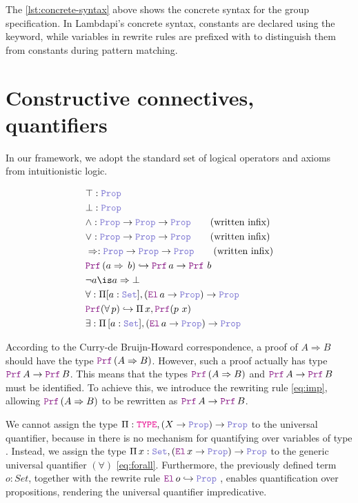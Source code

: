 The \cref{lst:concrete-syntax} above shows the concrete syntax for the group specification. In Lambdapi's concrete syntax, constants are declared using the  keyword,
while variables in rewrite rules are prefixed with \kw{\$} to distinguish them from constants during pattern matching.


\section{Constructive connectives, quantifiers}
\label{ssec:encoding-prop}

In our framework, we adopt the standard set of logical operators and axioms from intuitionistic logic.

\begin{definition}
\begin{align}
& \top : \prop \\
& \bot : \prop \\
& \land : \prop \ra \prop \ra \prop \qquad \text{(written inﬁx)} \\
& \lor : \prop \ra \prop \ra \prop \qquad \text{(written inﬁx)} \\
& \Rightarrow : \prop \ra \prop \ra \prop \qquad \text{(written inﬁx)} \\
&  \prf\,(a \Rightarrow\,b) \re \prf\, a \ra \prf\,\,b \label{eq:imp}\\
& \neg a \is a \Rightarrow \bot \\
& \forall : \Pi {[a: \set]}, (\el\, a \ra \prop) \ra \prop \label{eq:forall}\\
& \prf{}(\forall\,p) \re \Pi\, x, \prf{(p~x)}\\
& \exists : \Pi\, {[a: \set]}, (\el\, a \ra \prop) \ra \prop
\end{align}
\end{definition}

According to the Curry-de Bruijn-Howard correspondence, a proof of $A \Rightarrow B$ should have the type $\prf\,(A \Rightarrow B)$.
However, such a proof actually has type $\prf\,A \ra \prf\,B$. This means that the types $\prf\,(A \Rightarrow B)$ and $\prf\,A \ra \prf\,B$ must be identiﬁed.
To achieve this, we introduce the rewriting rule \cref{eq:imp}, allowing $\prf\,(A \Rightarrow B)$ to be rewritten as $\prf\,A \ra \prf\,B$.

We cannot assign the type $\Pi : \type, (X \ra \prop) \ra \prop$ to the universal quantifier, because in \lpm{} there is no mechanism for quantifying over variables of type \type.
Instead, we assign the type $\Pi\,x:\set{},(\el\,x \ra \prop) \ra \prop$ to the generic universal quantiﬁer $(\forall)$ \cref{eq:forall}.
Furthermore, the previously defined term $o: Set$, together with the rewrite rule $\el\,o\index{o}  \hookrightarrow \prop$
, enables quantification over propositions, rendering the universal quantifier impredicative.

